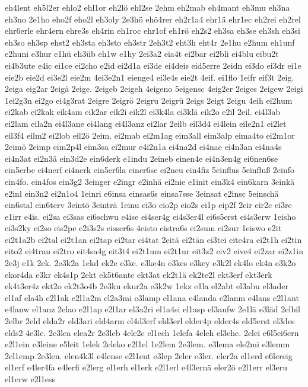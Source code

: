 {eh4lent
eh5l2er
ehlo2
ehl1or
eh2lö
ehl2se
2ehm
eh2mab
eh4mant
eh3mu
eh3na
eh3no
2e1ho
eho2f
eho2l
eh3oly
2e3hö
ehö4rer
eh2r1a4
ehr1ä
ehr1ec
eh2rei
eh2rel
ehr6erle
ehr4ern
ehre3s
eh4rin
eh1roc
ehr1of
eh1rö
eh2s2
eh3sa
eh3se
eh3sh
eh3si
eh3so
eh3sp
ehst2
eh3sta
eh3sto
eh3str
2eh3t2
eht3h
eht4r
2e1hu
e2hum
eh1unf
e2huni
e3hur
e1hü
eh3üb
eh1w
e1hy
2ei3a2
eia4t
ei2bar
ei2bli
ei4blu
eibu2t
ei4b3ute
e4ic
ei1ce
ei2cho
e2id
ei2d1a
ei3de
ei4deis
eid5erre
2eidn
ei3do
ei3dr
ei1e
eie2b
eie2d
ei3e2l
eie2m
4ei3e2n1
eienge4
ei3e4s
eie2t
4eif.
ei1flo
1eifr
eif3t
2eig.
2eiga
eig2ar
2eigä
2eige.
2eigeb
2eigeh
4eigeno
5eigensc
4eig2er
2eiges
2eigew
2eigi
1ei2g3n
ei2go
ei4g3rat
2eigre
2eigrö
2eigru
2eigrü
2eigs
2eigt
2eigu
4eih
ei2hum
ei2kab
ei2kak
eik4am
eik2ar
eik2i
eik2l
ei3k4la
ei3klä
eik2o
e2il
2eil.
ei4l3ab
ei2lam
eila2n
ei4l3ane
ei4lang
ei4l3anz
ei2lar
2eilb
eil3d4
ei4lein
eile2n1
ei2let
eil3f4
eilm2
ei2lob
eil2ö
2eim.
ei2mab
ei2m1ag
eim3all
eim3alp
eima4to
ei2m1or
2eimö
2eimp
eim2p4l
eim3sa
ei2mur
e4i2n1a
ei4na2d
ei4nae
ei4n3an
ei4na4s
ei4n3at
ei2n3ä
ein3d2e
ein6derk
e1indu
2eineb
einen4e
ei4n3en4g
ei6nen6se
ein5erbe
ei4nerf
ei4nerk
ein5er6la
einer6sc
ei2neu
ein4fiz
5einflus
5einfluß
2einfo
ein4fo.
ein4fos
ein3g2
3einger
e2ingr
e2inhä
ei2nie
e1init
ein3k4
ein6karn
3einkä
e2inl
ein3n2
ei2n1o4
1einri
e6insa
einsas6s
einsa7sse
3einsat
e2insc
5einschä
ein6stal
ein6terv
3eintö
3einträ
1einu
ei3o
eio2p
eio2s
ei1p
eip2f
2eir
eir2c
ei3re
e1irr
e4is.
ei2sa
ei3sas
ei6schwu
e4ise
ei4ser4g
ei4s3er4l
ei6s5erst
ei4s3erw
1eisho
ei3s2ky
ei2so
eis2pe
e2i3s2s
eisser6s
4eisto
eistra6s
ei2sum
ei2sur
1eiswo
e2it
ei2t1a2b
ei2tal
ei2t1an
ei2tap
ei2tar
ei4tat
2eitä
ei2tän
ei3tei
eite4ra
ei2t1h
ei2tin
eito2
ei4trau
ei2tro
eit4sa4g
eit3t4
ei2t1um
ei2t1ur
eit3z2
eiv2
eive4
ei2zar
ei2z1in
2e3j
e1k
2ek.
2e3k2a
1ekd
ek2e
e3ke.
e3ke4n
e3kes
e3key
e3k2l
ek4lo
ek4n
e3k2o
ekor4da
e3kr
ek4s1p
2ekt
ek5t6ante
ekt3at
ek2t1ä
ek2te2l
ekt3erf
ekt3erk
ek4t3er4z
ekt2o
ek2t3o4b
2e3ku
ekur2a
e3k2w
1ekz
e1la
el2abt
el3abu
el3ader
el1af
ela4h
e2l1ak
e2l1a2m
el2a3mi
e3lamp
el1ana
e4landa
e2lanm
e4lans
e2l1ant
e4lanw
el1anz
2elao
e2l1ap
e2l1ar
el3a2ri
el1a4si
el1asp
el3aufw
2e1lä
e3läd
2elbil
2elbr
2eld
elda2r
eld3ari
eld4arm
el4d3erf
eld3erl
elder4p
elder4s
eld5erst
el3des
elds2
4e3le.
2e3lea
elea2r
2e3leb
4ele2c
el1ech
1elefa
4eleh
el3ehe.
2elei
e6l5ei6ern
e2l1ein
e3leine
e5leit
1elek
2eleko
e2l1el
1e2lem
2e3lem.
e3lema
ele2mi
e3lemm
2el1emp
2e3len.
elen4k3l
e4lense
e2l1ent
e3lep
2eler
e3ler.
eler2a
el1erd
e6lereig
el1erf
e4ler4fa
e4lerfi
e2lerg
el1erh
el1erk
e2l1erl
e4l3ernä
eler2ö
e2l1err
el3eru
el1erw
e2l1ess
}
